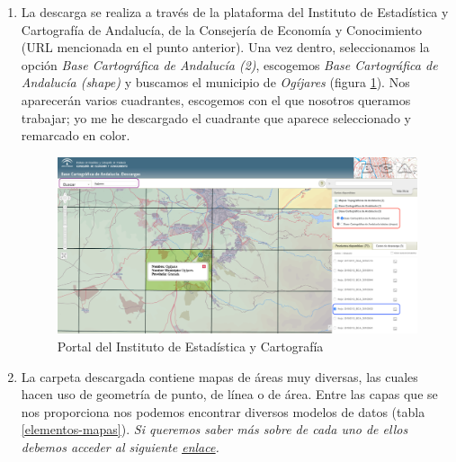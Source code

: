 \begin{enumerate}
	\item La descarga se realiza a través de la plataforma del Instituto de Estadística y Cartografía de Andalucía, de la Consejería de Economía y Conocimiento (URL mencionada en el punto anterior). Una vez dentro, seleccionamos la opción \textit{Base Cartográfica de Andalucía (2)}, escogemos \textit{Base Cartográfica de Andalucía (shape)} y buscamos el municipio de \textit{Ogíjares} (figura \ref{fig:obtencion-informacion}). Nos aparecerán varios cuadrantes, escogemos con el que nosotros queramos trabajar; yo me he descargado el cuadrante que aparece seleccionado y remarcado en color.
	
	\begin{figure}[H]
		\centering
		\includegraphics[width=1\linewidth]{imagenes/capitulo4/obtencion-informacion}
		\caption{Portal del Instituto de Estadística y Cartografía}
		\label{fig:obtencion-informacion}
	\end{figure}

	\item La carpeta descargada contiene mapas de áreas muy diversas, las cuales hacen uso de geometría de punto, de línea o de área. Entre las capas que se nos proporciona nos podemos encontrar diversos modelos de datos (tabla \ref{elementos-mapas}). \textit{Si queremos saber más sobre de cada uno de ellos debemos acceder al siguiente \underline{\href{https://www.juntadeandalucia.es/institutodeestadisticaycartografia/prodCartografia/bc/modelo/00_Modelo_Datos_Base_Cartografica_Andalucia.pdf}{enlace}}.}
	
	
	

\end{enumerate}
